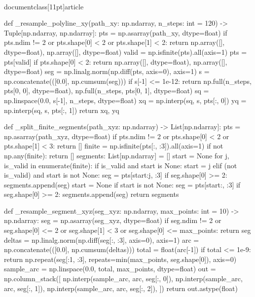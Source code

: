 \\documentclass[11pt]{article}
\begin{document}
\begin{CodeBlock}
{{    def _resample_polyline_xy(path_xy: np.ndarray, n_steps: int = 120) -> Tuple[np.ndarray, np.ndarray]:
        pts = np.asarray(path_xy, dtype=float)
        if pts.ndim != 2 or pts.shape[0] < 2 or pts.shape[1] < 2:
            return np.array([], dtype=float), np.array([], dtype=float)
        valid = np.isfinite(pts).all(axis=1)
        pts = pts[valid]
        if pts.shape[0] < 2:
            return np.array([], dtype=float), np.array([], dtype=float)
        seg = np.linalg.norm(np.diff(pts, axis=0), axis=1)
        s = np.concatenate(([0.0], np.cumsum(seg)))
        if s[-1] <= 1e-12:
            return np.full(n_steps, pts[0, 0], dtype=float), np.full(n_steps, pts[0, 1], dtype=float)
        sq = np.linspace(0.0, s[-1], n_steps, dtype=float)
        xq = np.interp(sq, s, pts[:, 0])
        yq = np.interp(sq, s, pts[:, 1])
        return xq, yq

    def _split_finite_segments(path_xyz: np.ndarray) -> List[np.ndarray]:
        pts = np.asarray(path_xyz, dtype=float)
        if pts.ndim != 2 or pts.shape[0] < 2 or pts.shape[1] < 3:
            return []
        finite = np.isfinite(pts[:, :3]).all(axis=1)
        if not np.any(finite):
            return []
        segments: List[np.ndarray] = []
        start = None
        for j, is_valid in enumerate(finite):
            if is_valid and start is None:
                start = j
            elif (not is_valid) and start is not None:
                seg = pts[start:j, :3]
                if seg.shape[0] >= 2:
                    segments.append(seg)
                start = None
        if start is not None:
            seg = pts[start:, :3]
            if seg.shape[0] >= 2:
                segments.append(seg)
        return segments

    def _resample_segment_xyz(seg_xyz: np.ndarray, max_points: int = 10) -> np.ndarray:
        seg = np.asarray(seg_xyz, dtype=float)
        if seg.ndim != 2 or seg.shape[0] <= 2 or seg.shape[1] < 3 or seg.shape[0] <= max_points:
            return seg
        deltas = np.linalg.norm(np.diff(seg[:, :3], axis=0), axis=1)
        arc = np.concatenate(([0.0], np.cumsum(deltas)))
        total = float(arc[-1])
        if total <= 1e-9:
            return np.repeat(seg[:1, :3], repeats=min(max_points, seg.shape[0]), axis=0)
        sample_arc = np.linspace(0.0, total, max_points, dtype=float)
        out = np.column_stack([
            np.interp(sample_arc, arc, seg[:, 0]),
            np.interp(sample_arc, arc, seg[:, 1]),
            np.interp(sample_arc, arc, seg[:, 2]),
        ])
        return out.astype(float)

}}
\end{CodeBlock}
\end{document}
